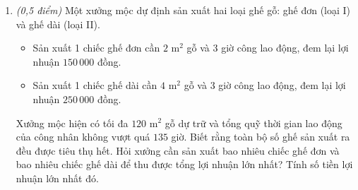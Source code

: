 \documentclass[12pt,a4paper]{article}
\newcommand{\parttitle}[1]{\par\vspace{2pt}{\large\bfseries\color{ink}#1}\par\vspace{1pt}}
\begin{document}
\begin{enumerate}[resume]
\begin{center}
\end{center}

\begin{enumerate}
    \item Tính độ dài khoảng cách $BC$ từ điểm quan sát $B$ đến đỉnh tháp $C$.
    \item Tính chiều cao $CH$ của tháp truyền hình (kết quả làm tròn đến hàng phần mười của mét).
\end{enumerate}

\item \textit{(0,5 điểm)} Một xưởng mộc dự định sản xuất hai loại ghế gỗ: ghế đơn (loại I) và ghế dài (loại II).
\begin{itemize}[leftmargin=0.5cm]
    \item Sản xuất 1 chiếc ghế đơn cần $2\text{ m}^2$ gỗ và $3$ giờ công lao động, đem lại lợi nhuận $150\,000$ đồng.
    \item Sản xuất 1 chiếc ghế dài cần $4\text{ m}^2$ gỗ và $3$ giờ công lao động, đem lại lợi nhuận $250\,000$ đồng.
\end{itemize}
Xưởng mộc hiện có tối đa $120\text{ m}^2$ gỗ dự trữ và tổng quỹ thời gian lao động của công nhân không vượt quá $135$ giờ. Biết rằng toàn bộ số ghế sản xuất ra đều được tiêu thụ hết. Hỏi xưởng cần sản xuất bao nhiêu chiếc ghế đơn và bao nhiêu chiếc ghế dài để thu được tổng lợi nhuận lớn nhất? Tính số tiền lợi nhuận lớn nhất đó.
\end{enumerate}

\newpage
\parttitle{BẢNG ĐÁP ÁN TỔNG HỢP}
\end{document}
